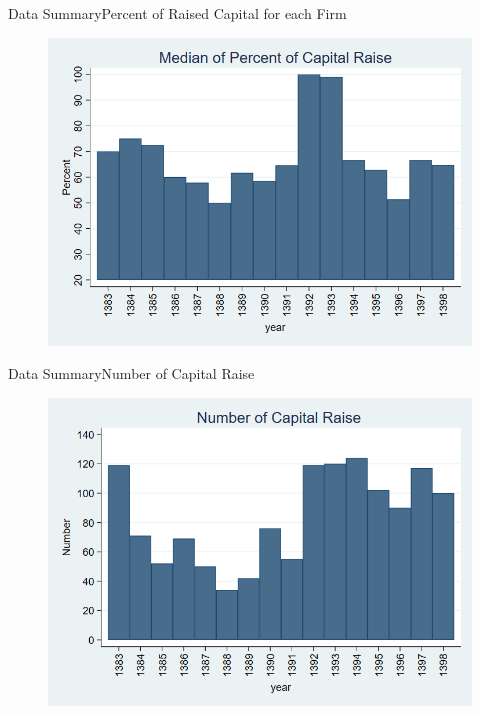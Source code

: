 \documentclass{beamer}
\begin{document}
	\begin{frame}{Data Summary}{Percent of Raised Capital for each Firm}
		\begin{figure}
			\centering
			\includegraphics[width=0.7\linewidth]{MedianPercent.png}
			\label{fig:medianpercent}
		\end{figure}
	\end{frame}
	
	\begin{frame}{Data Summary}{Number of Capital Raise}
		\begin{figure}
			\centering
			\includegraphics[width=0.7\linewidth]{Number.png}
			\label{fig:number}
		\end{figure}
	\end{frame}
	
\end{document}
